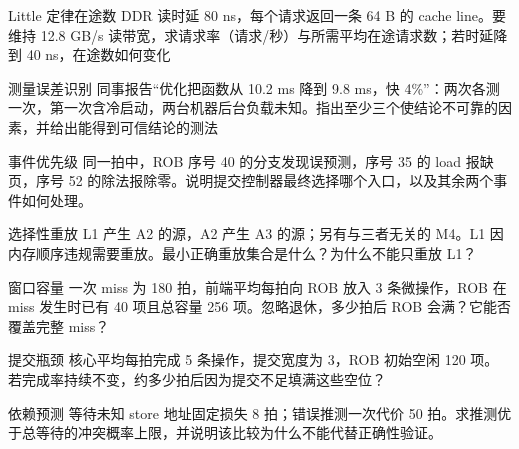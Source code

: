 \begin{chapterexercise}{Little 定律在途数}
DDR 读时延 80 ns，每个请求返回一条 64 B 的 cache line。要维持 12.8 GB/s 读带宽，求请求率（请求/秒）与所需平均在途请求数；若时延降到 40 ns，在途数如何变化
\end{chapterexercise}

\begin{chapterexercise}{测量误差识别}
同事报告“优化把函数从 10.2 ms 降到 9.8 ms，快 4\%”：两次各测一次，第一次含冷启动，两台机器后台负载未知。指出至少三个使结论不可靠的因素，并给出能得到可信结论的测法
\end{chapterexercise}

\begin{chapterexercise}{事件优先级}
同一拍中，ROB 序号 40 的分支发现误预测，序号 35 的 load 报缺页，序号 52 的除法报除零。说明提交控制器最终选择哪个入口，以及其余两个事件如何处理。
\end{chapterexercise}

\begin{chapterexercise}{选择性重放}
L1 产生 A2 的源，A2 产生 A3 的源；另有与三者无关的 M4。L1 因内存顺序违规需要重放。最小正确重放集合是什么？为什么不能只重放 L1？
\end{chapterexercise}

\begin{chapterexercise}{窗口容量}
一次 miss 为 180 拍，前端平均每拍向 ROB 放入 3 条微操作，ROB 在 miss 发生时已有 40 项且总容量 256 项。忽略退休，多少拍后 ROB 会满？它能否覆盖完整 miss？
\end{chapterexercise}

\begin{chapterexercise}{提交瓶颈}
核心平均每拍完成 5 条操作，提交宽度为 3，ROB 初始空闲 120 项。若完成率持续不变，约多少拍后因为提交不足填满这些空位？
\end{chapterexercise}

\begin{chapterexercise}{依赖预测}
等待未知 store 地址固定损失 8 拍；错误推测一次代价 50 拍。求推测优于总等待的冲突概率上限，并说明该比较为什么不能代替正确性验证。
\end{chapterexercise}


